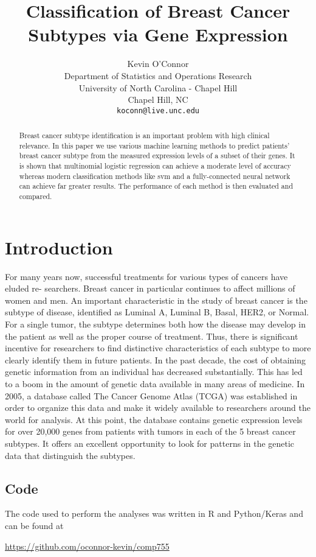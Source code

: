 \documentclass{article}
\title{Classification of Breast Cancer Subtypes via Gene Expression}
\author{
  Kevin O'Connor  \\
  Department of Statistics and Operations Research\\
  University of North Carolina - Chapel Hill\\
  Chapel Hill, NC \\
  \texttt{koconn@live.unc.edu} \\
}
\begin{document}

\maketitle

\begin{abstract}
Breast cancer subtype identification is an important problem with high clinical relevance. In this paper we use various machine learning methods to predict patients' breast cancer subtype from the measured expression levels of a subset of their genes. It is shown that multinomial logistic regression can achieve a moderate level of accuracy whereas modern classification methods like svm and a fully-connected neural network can achieve far greater results. The performance of each method is then evaluated and compared.
\end{abstract}

\section{Introduction}
For many years now, successful treatments for various types of cancers have eluded re- searchers. Breast cancer in particular continues to affect millions of women and men. An important characteristic in the study of breast cancer is the subtype of disease, identified as Luminal A, Luminal B, Basal, HER2, or Normal. For a single tumor, the subtype determines both how the disease may develop in the patient as well as the proper course of treatment. Thus, there is significant incentive for researchers to find distinctive characteristics of each subtype to more clearly identify them in future patients.
\newline\newline In the past decade, the cost of obtaining genetic information from an individual has decreased substantially. This has led to a boom in the amount of genetic data available in many areas of medicine. In 2005, a database called The Cancer Genome Atlas (TCGA) was established in order to organize this data and make it widely available to researchers around the world for analysis. At this point, the database contains genetic expression levels for over 20,000 genes from patients with tumors in each of the 5 breast cancer subtypes. It offers an excellent opportunity to look for patterns in the genetic data that distinguish the subtypes.

\subsection{Code}
The code used to perform the analyses was written in R and Python/Keras and can be found at 
\begin{center}
\url{https://github.com/oconnor-kevin/comp755}
\end{center}
\end{document}
